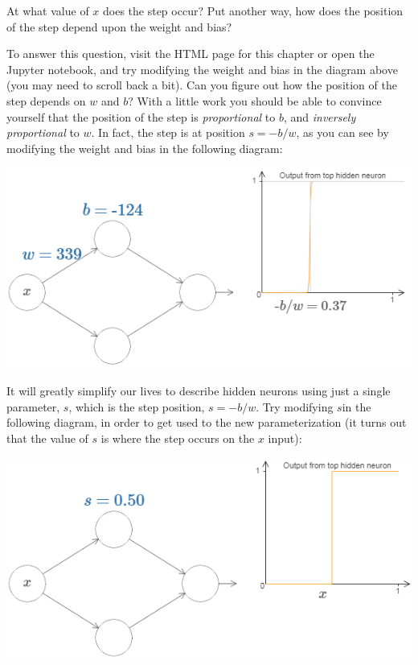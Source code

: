 At what value of $x$ does the step occur? Put another way, how does the position of the step depend upon the weight and bias?

To answer this question, visit the HTML page for this chapter or open the Jupyter notebook, and try modifying the weight and bias in the diagram above (you may need to scroll back a bit). Can you figure out how the position of the step depends on $w$ and $b$? With a little work you should be able to convince yourself that the position of the step is \textit{proportional} to $b$, and \textit{inversely proportional} to $w$.
In fact, the step is at position $s=-b/w$, as you can see by modifying the weight and bias in the following diagram:

{\centering \includegraphics[width=\textwidth,]{pic/wigglyfn09.png} \par}



It will greatly simplify our lives to describe hidden neurons using just a single parameter, $s$, which is the step position, $s=-b/w$. Try modifying $s$in the following diagram, in order to get used to the new parameterization (it turns out that the value of $s$ is where the step occurs on the $x$ input):


{\centering \includegraphics[width=\textwidth,]{pic/wigglyfn10.png} \par}

